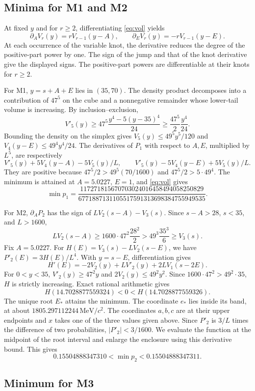 \documentclass[11pt,a4paper]{article}
\newcommand{\unit}{\,\mathrm{MeV}/c^{2}}
\begin{document}
\subsection{Minima for M1 and M2}

At fixed $y$ and for $r\geq2$, differentiating \eqref{eq:vol} yields
\[
\partial_A V_r(y)=rV_{r-1}(y-A),\qquad
\partial_E V_r(y)=-rV_{r-1}(y-E).
\]
At each occurrence of the variable knot, the derivative reduces the degree of the positive-part power by one. The sign of the jump and that of the knot derivative give the displayed signs. The positive-part powers are differentiable at their knots for $r\geq2$.

For M1, $y=s+A+E$ lies in $(35,70)$. The density product decomposes into a contribution of $47^5$ on the cube and a nonnegative remainder whose lower-tail volume is increasing. By inclusion--exclusion,
\[
V'_5(y)\geq47^5\frac{y^4-5(y-35)^4}{24}
\geq\frac{47^5}{2}\frac{y^4}{24}.
\]
Bounding the density on the simplex gives $V_5(y)\leq49^5y^5/120$ and $V_4(y-E)\leq49^4y^4/24$. The derivatives of $P_1$ with respect to $A,E$, multiplied by $L^5$, are respectively
\[
V'_5(y)+5V_4(y-A)-5V_5(y)/L,\qquad
V'_5(y)-5V_4(y-E)+5V_5(y)/L.
\]
They are positive because $47^5/2>49^5(70/1600)$ and $47^5/2>5\cdot49^4$. The minimum is attained at $A=5.0227$, $E=1$, and \eqref{eq:vol} gives
\[
\min p_1=\frac{117271815670703024016458494058250829}
{6771887131105517591313698384755949535}.
\]

For M2, $\partial_A P_2$ has the sign of $LV_2(s-A)-V_3(s)$. Since $s-A>28$, $s<35$, and $L>1600$,
\[
LV_2(s-A)\geq1600\cdot47^2\frac{28^2}{2}
>49^3\frac{35^3}{6}\geq V_3(s).
\]
Fix $A=5.0227$. For $H(E)=V_3(s)-LV_2(s-E)$, we have $P'_2(E)=3H(E)/L^4$. With $y=s-E$, differentiation gives
\[
H'(E)=-2V_2(y)+LV'_2(y)+2LV_1(s-2E).
\]
For $0<y<35$, $V'_2(y)\geq47^2y$ and $2V_2(y)\leq49^2y^2$. Since $1600\cdot47^2>49^2\cdot35$, $H$ is strictly increasing. Exact rational arithmetic gives
\[
H(14.7028877559324)<0<H(14.7028877559326).
\]
The unique root $E_*$ attains the minimum. The coordinate $e_*$ lies inside its band, at about $1805.297112244\unit$. The coordinates $a,b,c$ are at their upper endpoints and $x$ takes one of the three values given above. Since $P'_2$ is $3/L$ times the difference of two probabilities, $|P'_2|<3/1600$. We evaluate the function at the midpoint of the root interval and enlarge the enclosure using this derivative bound. This gives
\[
0.15504888347310<\min p_2<0.15504888347311.
\]

\subsection{Minimum for M3}
\end{document}
